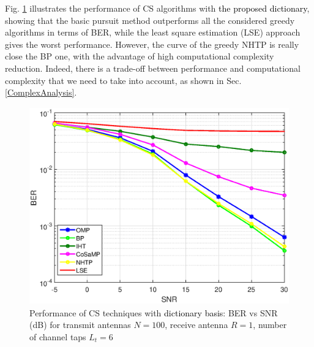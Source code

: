 
Fig. \ref{Fig_result2} illustrates the performance of CS algorithms with \textcolor{black}{the proposed dictionary}, showing that the basic pursuit method outperforms all the considered greedy algorithms in terms of BER, while the least square estimation (LSE) approach gives the worst performance. However, the curve of the greedy NHTP is really close the BP one, with the advantage of high computational complexity reduction.
Indeed, there is a trade-off between performance and computational complexity that we need to take into account, as shown in Sec. \ref{ComplexAnalysis}.

\begin{figure}
	\centering
	\includegraphics[width=120mm,height=85mm]{figures/figchap4/Fig2b.eps}
	\caption{Performance of CS techniques with \textcolor{black}{dictionary basis}: BER vs SNR (dB) for transmit antennas $N=100$, receive antenna $R=1$, number of channel taps $L_t=6$}	
	\label{Fig_result2}
\end{figure}

